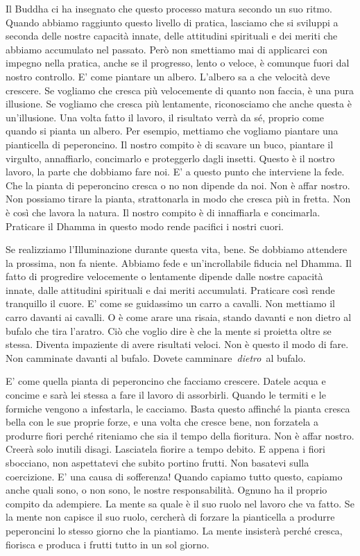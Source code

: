 Il Buddha ci ha insegnato che questo processo matura secondo un suo
ritmo. Quando abbiamo raggiunto questo livello di pratica, lasciamo che
si sviluppi a seconda delle nostre capacità innate, delle attitudini
spirituali e dei meriti che abbiamo accumulato nel passato. Però non
smettiamo mai di applicarci con impegno nella pratica, anche se il
progresso, lento o veloce, è comunque fuori dal nostro controllo. E'
come piantare un albero. L'albero sa a che velocità deve crescere. Se
vogliamo che cresca più velocemente di quanto non faccia, è una pura
illusione. Se vogliamo che cresca più lentamente, riconosciamo che anche
questa è un'illusione. Una volta fatto il lavoro, il risultato verrà da
sé, proprio come quando si pianta un albero. Per esempio, mettiamo che
vogliamo piantare una pianticella di peperoncino. Il nostro compito è di
scavare un buco, piantare il virgulto, annaffiarlo, concimarlo e
proteggerlo dagli insetti. Questo è il nostro lavoro, la parte che
dobbiamo fare noi. E' a questo punto che interviene la fede. Che la
pianta di peperoncino cresca o no non dipende da noi. Non è affar
nostro. Non possiamo tirare la pianta, strattonarla in modo che cresca
più in fretta. Non è così che lavora la natura. Il nostro compito è di
innaffiarla e concimarla. Praticare il Dhamma in questo modo rende
pacifici i nostri cuori.

Se realizziamo l'Illuminazione durante questa vita, bene. Se dobbiamo
attendere la prossima, non fa niente. Abbiamo fede e un'incrollabile
fiducia nel Dhamma. Il fatto di progredire velocemente o lentamente
dipende dalle nostre capacità innate, dalle attitudini spirituali e dai
meriti accumulati. Praticare così rende tranquillo il cuore. E' come se
guidassimo un carro a cavalli. Non mettiamo il carro davanti ai cavalli.
O è come arare una risaia, stando davanti e non dietro al bufalo che
tira l'aratro. Ciò che voglio dire è che la mente si proietta oltre se
stessa. Diventa impaziente di avere risultati veloci. Non è questo il
modo di fare. Non camminate davanti al bufalo. Dovete
camminare~\emph{dietro}~al bufalo.

E' come quella pianta di peperoncino che facciamo crescere. Datele acqua
e concime e sarà lei stessa a fare il lavoro di assorbirli. Quando le
termiti e le formiche vengono a infestarla, le cacciamo. Basta questo
affinché la pianta cresca bella con le sue proprie forze, e una volta
che cresce bene, non forzatela a produrre fiori perché riteniamo che sia
il tempo della fioritura. Non è affar nostro. Creerà solo inutili
disagi. Lasciatela fiorire a tempo debito. E appena i fiori sbocciano,
non aspettatevi che subito portino frutti. Non basatevi sulla
coercizione. E' una causa di sofferenza! Quando capiamo tutto questo,
capiamo anche quali sono, o non sono, le nostre responsabilità. Ognuno
ha il proprio compito da adempiere. La mente sa quale è il suo ruolo nel
lavoro che va fatto. Se la mente non capisce il suo ruolo, cercherà di
forzare la pianticella a produrre peperoncini lo stesso giorno che la
piantiamo. La mente insisterà perché cresca, fiorisca e produca i frutti
tutto in un sol giorno.

